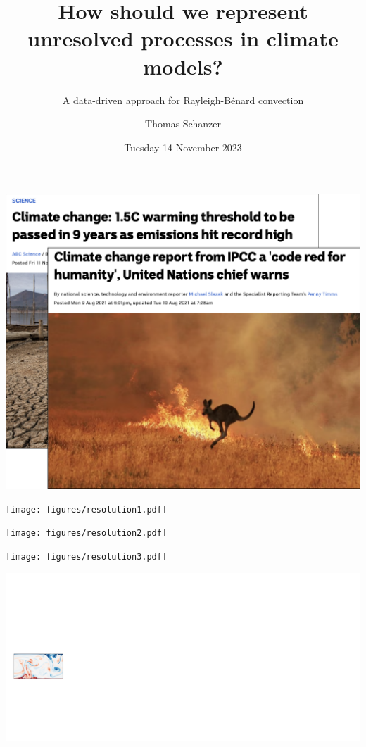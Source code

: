 \documentclass[12pt, aspectratio=169]{beamer}
\title{
    How should we represent unresolved processes in climate models?
}
\subtitle{A data-driven approach for Rayleigh-Bénard convection}
\author{Thomas Schanzer}
\institute{
    School of Physics and Climate Change Research Centre
}
\date{Tuesday 14 November 2023}
\begin{document}
\begin{frame}
\maketitle
\end{frame}

\begin{frame}
    \centering
    \includegraphics[height=0.99\textheight]{figures/news.png}
\end{frame}

\begin{frame}
    \centering
    \texttt{[image: figures/resolution1.pdf]}
\end{frame}

\begin{frame}
    \centering
    \texttt{[image: figures/resolution2.pdf]}
\end{frame}

\begin{frame}
    \centering
    \texttt{[image: figures/resolution3.pdf]}
\end{frame}

\begin{frame}
    \centering
    \includegraphics[width=\linewidth]{figures/method1.pdf}
\end{frame}
\end{document}

